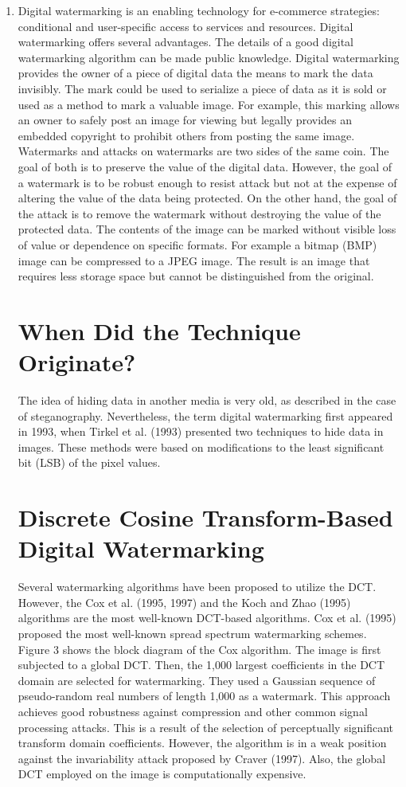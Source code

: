 \documentclass[12pt]{IEEEtran}
\begin{document}
\begin{enumerate}
\item Digital watermarking is an enabling technology for e-commerce strategies: conditional and user-specific access to services and resources. Digital watermarking offers several advantages. The details of a good digital watermarking algorithm can be made public knowledge. Digital watermarking provides the owner of a piece of digital data the means to mark the data invisibly. The mark could be used to serialize a piece of data as it is sold or used as a method to mark a valuable image. For example, this marking allows an owner to safely post an image for viewing but legally provides an embedded copyright to prohibit others from posting the same image. Watermarks and attacks on watermarks are two sides of the same coin. The goal of both is to preserve the value of the digital data. However, the goal of a watermark is to be robust enough to resist attack but not at the expense of altering the value of the data being protected. On the other hand, the goal of the attack is to remove the watermark without destroying the value of the protected data. The contents of the image can be marked without visible loss of value or dependence on specific formats. For example a bitmap (BMP) image can be compressed to a JPEG image. The result is an image that requires less storage space but cannot be distinguished from the original.
\section*{When Did the Technique Originate?}
The idea of hiding data in another media is very old, as described in the case of steganography. Nevertheless, the term digital watermarking first appeared in 1993, when Tirkel et al. (1993) presented two techniques to hide data in images. These methods were based on modifications to the least significant bit (LSB) of the pixel values.\\
\section{Discrete Cosine Transform-Based Digital Watermarking}
Several watermarking algorithms have been proposed to utilize the DCT. However, the Cox et al. (1995, 1997) and the Koch and Zhao (1995) algorithms are the most well-known DCT-based algorithms. Cox et al. (1995) proposed the most well-known spread spectrum watermarking schemes. Figure 3 shows the block diagram of the Cox algorithm. The image is first subjected to a global DCT. Then, the 1,000 largest coefficients in the DCT domain are selected for watermarking. They used a Gaussian sequence of pseudo-random real numbers of length 1,000 as a watermark. This approach achieves good robustness against compression and other common signal processing attacks. This is a result of the selection of perceptually significant transform domain coefficients. However, the algorithm is in a weak position against the invariability attack proposed by Craver (1997). Also, the global DCT employed on the image is computationally expensive.


\end{enumerate}
\end{document}
